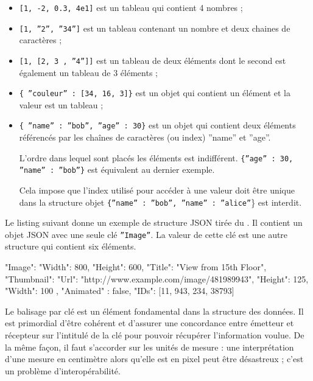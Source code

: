 \begin{itemize}
    \item \texttt{[1, -2, 0.3, 4e1]} est un tableau qui contient 4 nombres ;
    \item \texttt{[1, ”2”, ”34”]} est un tableau contenant un nombre et deux chaines de caractères ;
    \item \texttt{[1, [2, 3 , ”4”]]} est un tableau de deux éléments dont le second est également un tableau de 3 éléments ;
    \item \texttt{\{ ”couleur” : [34, 16, 3]\}} est un objet qui contient un élément et la valeur est un tableau ; 
    \item \texttt{\{ ”name” : ”bob”, ”age” : 30\}} est un objet qui contient deux éléments référencés par les chaînes de caractères (ou index)  ”name” et ”age”.
    
    L’ordre dans lequel sont placés les éléments est indifférent. \texttt{\{”age” : 30, ”name” : ”bob”\}} est équivalent au dernier exemple. 

    Cela impose que l’index utilisé pour accéder à une valeur doit être unique dans la structure objet \texttt{\{”name” : ”bob”, ”name” : ”alice”}\} est interdit.
\end{itemize}

     \vspace{1em}

Le listing suivant donne un exemple de structure JSON tirée du . Il contient un objet JSON avec une seule clé \texttt{”Image”}. La valeur de cette clé est une autre structure qui contient six éléments. 

\begin{termc}[backgroundcolor=\color{palerod}, language=json]
{
"Image": {
      "Width": 800,
      "Height": 600,
      "Title": "View from 15th Floor",
      "Thumbnail": {   
           "Url": "http://www.example.com/image/481989943",
           "Height": 125,
           "Width": 100
       },
       "Animated" : false,
       "IDs": [11, 943, 234, 38793]
    }
}
\end{termc}

Le balisage par clé est un élément fondamental dans la structure des données. Il est primordial d'être cohérent et d'assurer une concordance entre émetteur et récepteur sur l'intitulé de la clé pour pouvoir récupérer l'information voulue. De la même façon, il faut s'accorder sur les unités de mesure : une interprétation d'une mesure en centimètre alors qu'elle est en pixel peut être désastreux ; c'est un problème d'interopérabilité.
     \vspace{1em}

